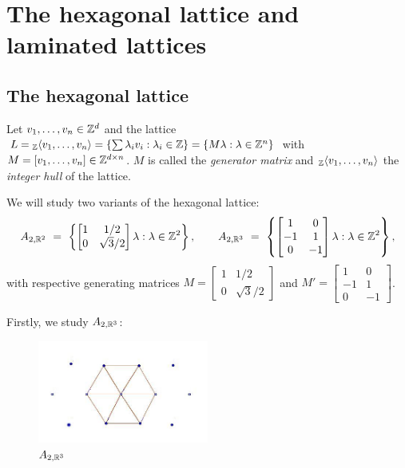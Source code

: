 \chapter{The hexagonal lattice and laminated lattices}

\section{The hexagonal lattice}

\begin{definition}
  Let $v_1,\ldots,v_n\in \mathbb{Z}^{d}$ and the lattice $L= {}_{\mathbb{Z}}\!\left\langle v_1,\ldots,v_n
  \right\rangle=\left\{\sum\lambda_i v_i : \lambda_i \in \mathbb{Z}\right\}=
  \left\{M\lambda:\lambda\in \mathbb{Z}^{n}\right\}$ with
  $M=\left[v_1,\ldots,v_n\right]\in\mathbb{Z}^{d\times n}$. $M$ is called the \emph{generator
    matrix} and ${}_{\mathbb{Z}}\!\left\langle v_1,\ldots,v_n \right\rangle$ the \emph{integer hull} of the
  lattice.
\end{definition}


We will study two variants of the hexagonal lattice:
\[
  A_{2,\mathbb{R}^{2}}
  \ = \
  \left\{\begin{bmatrix}
        1 & 1/2 \\
        0 & \sqrt{3}/2 \end{bmatrix}\lambda:\lambda\in\mathbb{Z}^{2}\right\}, 
    \qquad
  A_{2,\mathbb{R}^{3}}
  \ = \
  \left\{\begin{bmatrix}
        1 & 0 \\
        -1 & 1 \\
        0 & -1 \end{bmatrix}\lambda:\lambda\in\mathbb{Z}^{2}\right\},
\]
with respective generating matrices
$M=\left[\begin{smallmatrix}
      1 & 1/2 \\
      0 & \sqrt{3}/2 \end{smallmatrix}\right]$ and
$M'=\left[\begin{smallmatrix}
      1 & 0 \\
      -1 & 1 \\
      0 & -1 \end{smallmatrix}\right]$. 

Firstly, we study $A_{2,\mathbb{R}^{3}}$:

\begin{figure}[htbp]
\centering
\includegraphics[width=0.5\textwidth]{apunteaklattice}
\caption{$A_{2,\mathbb{R}^{3}}$}
\end{figure}


